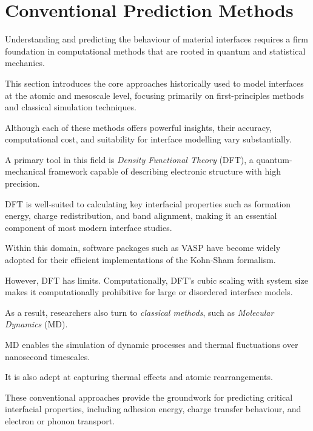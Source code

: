 \section{Conventional Prediction Methods} \label{section:conventional_methods}


Understanding and predicting the behaviour of material interfaces requires a firm foundation in computational methods
that are rooted in quantum and statistical mechanics\cite{ARTEMIS}.

This section introduces the core approaches historically used to model interfaces at the atomic and mesoscale level,
focusing primarily on first-principles methods and classical simulation techniques.

Although each of these methods offers powerful insights, their accuracy, computational cost, and suitability for
interface modelling vary substantially.


A primary tool in this field is \textit{Density Functional Theory} (DFT), a quantum-mechanical framework capable of
describing electronic structure with high precision.

DFT is well-suited to calculating key interfacial properties such as formation energy, charge redistribution, and band
alignment, making it an essential component of most modern interface studies\cite{Butler2019-ws}.

Within this domain, software packages such as \textsc{VASP} have become widely adopted for their efficient
implementations of the Kohn-Sham formalism\cite{Chagarov2015-ol, Leung2020-tv}.


However, DFT has limits. Computationally, DFT's cubic scaling with system size makes it computationally prohibitive for
large or disordered interface models\cite{Gerber2023-yd}.

As a result, researchers also turn to \textit{classical methods}, such as \textit{Molecular Dynamics} (MD)\cite{Hepplestone2010-vw, Khot2025-hh}.

MD enables the simulation of dynamic processes and thermal fluctuations over nanosecond timescales.

It is also adept at capturing thermal effects and atomic rearrangements\cite{Khot2025-hh, Schutt2018-xc}.


These conventional approaches provide the groundwork for predicting critical interfacial properties, including adhesion
energy, charge transfer behaviour, and electron or phonon transport.

